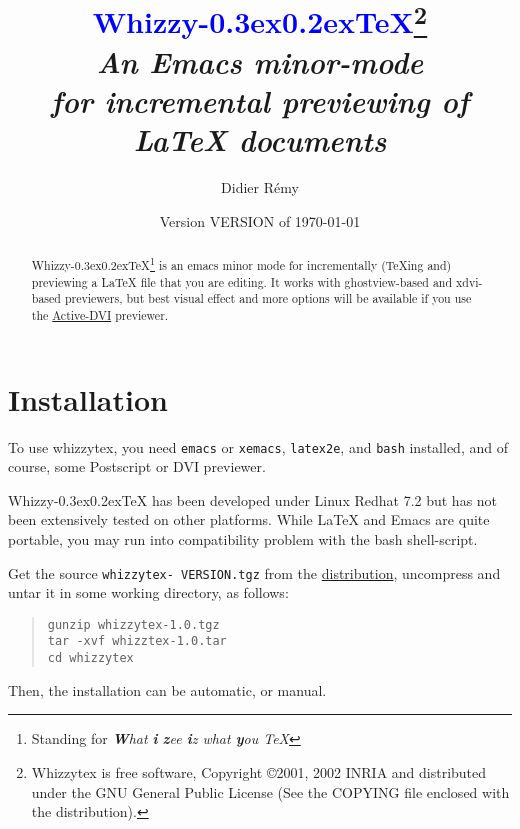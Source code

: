 \documentclass{article}
\makeatletter
\def \whizzy {{Whizzy\kern -0.3ex\raise 0.2ex\hbox{\let \@\relax\TeX}}}
\def \Whizzy{\textbf {\textcolor {blue}{\whizzy}}}
\def \version { {VERSION}}
\makeatother
\begin{document}
\pagestyle {empty}

\author {Didier R{\'e}my}
\date {Version {\version} of \today}
\title {
{\huge \Whizzy\footnote{Whizzytex is free software, 
Copyright \copyright 2001, 2002 INRIA
and distributed under the GNU General Public License
(See the COPYING file enclosed with the distribution).}}
\\[1em]
{\em An {\bfseries Emacs} minor-mode \\
for {\bfseries incremental previewing of} \\ 
{\bfseries {\LaTeX} documents}}
}

\maketitle   


\begin{abstract}
\def \B{\textbf}
{\whizzy}\footnote {Standing for {\em {\B W}hat {\B i} {\B z}ee
{\B i}z what {\B y}ou {\expandafter \B \TeX}}} is an emacs minor mode for
incrementally ({\TeX}ing and) previewing 
a {\LaTeX} file that you are editing.
%
It works with ghostview-based and xdvi-based previewers, but best 
visual effect and more options will be available if you use  the
\href{http://pauillac.inria.fr/advi/}{Active-DVI} previewer. 

\end{abstract}

\section {Installation}

To use whizzytex, you need {\tt emacs} or {\tt xemacs}, {\tt latex2e}, and
{\tt bash} installed, and of course, some Postscript or DVI previewer.

{\whizzy} has been developed under Linux Redhat 7.2 but has not been
extensively tested on other platforms. While {\LaTeX} and Emacs are quite
portable, you may run into compatibility problem with the bash
shell-script. 


Get the source 
{\tt whizzytex-\version.tgz} 
from the \href{http://pauillac.inria.fr/whizzytex}{distribution}, 
uncompress and untar it in some working directory, as follows:
\begin{quote}
\begin{verbatim}
gunzip whizzytex-1.0.tgz
tar -xvf whizztex-1.0.tar
cd whizzytex 
\end{verbatim}
\end{quote}
Then, the installation can be automatic, or manual.
\end{document}
